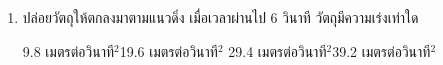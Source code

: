 \begin{enumerate}
	\item \runningj \nonet ปล่อยวัตถุให้ตกลงมาตามแนวดิ่ง  เมื่อเวลาผ่านไป  6  วินาที  วัตถุมีความเร่งเท่าใด
	\begin{2c}
		{9.8 เมตรต่อวินาที$^2$}{19.6 เมตรต่อวินาที$^2$}
		{29.4 เมตรต่อวินาที$^2$}{39.2 เมตรต่อวินาที$^2$}
	\end{2c}
\end{enumerate}
